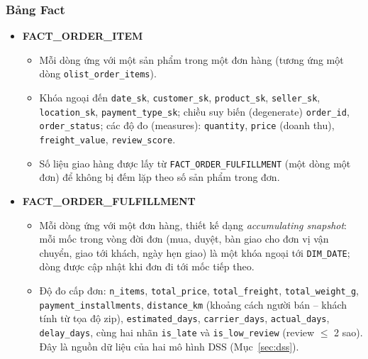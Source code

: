 \subsubsection{Bảng Fact}
\begin{itemize}
    \item \textbf{FACT\_ORDER\_ITEM} 
    \begin{itemize}
      \item Mỗi dòng ứng với một sản phẩm trong một đơn hàng (tương ứng một dòng \texttt{olist\_order\_items}). 
      \item Khóa ngoại đến \texttt{date\_sk}, \texttt{customer\_sk}, \texttt{product\_sk}, \texttt{seller\_sk},
          \texttt{location\_sk}, \texttt{payment\_type\_sk}; chiều suy
          biến (degenerate) \texttt{order\_id}, \texttt{order\_status}; các độ đo (measures):
          \texttt{quantity}, \texttt{price} (doanh thu), \texttt{freight\_value},
          \texttt{review\_score}. 
      \item Số liệu giao hàng được lấy từ \texttt{FACT\_ORDER\_FULFILLMENT} (một dòng
          một đơn) để không bị đếm lặp theo số sản phẩm trong đơn.
    \end{itemize}
    \item \textbf{FACT\_ORDER\_FULFILLMENT} 
      \begin{itemize}
            \item Mỗi dòng ứng với một đơn hàng, thiết kế dạng \textit{accumulating snapshot}: 
            mỗi mốc trong vòng đời đơn (mua, duyệt, bàn giao cho đơn vị vận chuyển, giao tới khách, ngày hẹn giao) là một khóa ngoại tới
          \texttt{DIM\_DATE}; dòng được cập nhật khi đơn đi tới mốc tiếp theo. 
            \item Độ đo cấp đơn: \texttt{n\_items}, \texttt{total\_price}, \texttt{total\_freight},
          \texttt{total\_weight\_g}, \texttt{payment\_installments}, \texttt{distance\_km}
          (khoảng cách người bán -- khách tính từ tọa độ zip), \texttt{estimated\_days},
          \texttt{carrier\_days}, \texttt{actual\_days}, \texttt{delay\_days}, cùng hai nhãn
          \texttt{is\_late} và \texttt{is\_low\_review} (review $\leq$ 2 sao). Đây là nguồn dữ
          liệu của hai mô hình DSS (Mục~\ref{sec:dss}).
      \end{itemize}
\end{itemize}

